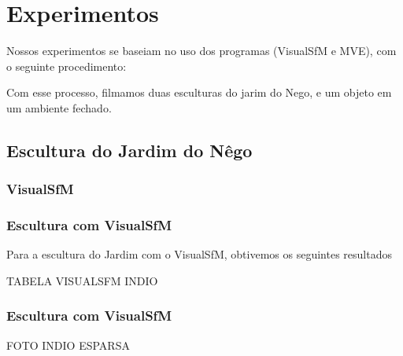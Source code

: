 \documentclass[table, usenames, svgnames, xcolor=dvipsnames]{beamer}
\begin{document}
\section{Experimentos}

\begin{frame}
	\begin{center}
		Nossos experimentos se baseiam no uso dos programas (VisualSfM e MVE), com o seguinte procedimento:
	\end{center}
\end{frame}

\begin{frame}
	\begin{center}
	\end{center}
\end{frame}

\begin{frame}
	\begin{center}
		Com esse processo, filmamos duas esculturas do jarim do Nego, e um objeto em um ambiente fechado. 
	\end{center}
\end{frame}

\subsection{Escultura do Jardim do Nêgo}


\subsubsection{VisualSfM}
\begin{frame}
\frametitle{\textbf{Escultura com VisualSfM}}
	Para a escultura do Jardim com o VisualSfM, obtivemos os seguintes resultados
	
	TABELA VISUALSFM INDIO
\end{frame}

\begin{frame}
\frametitle{\textbf{Escultura com VisualSfM}}
	FOTO INDIO ESPARSA
\end{frame}
\end{document}
